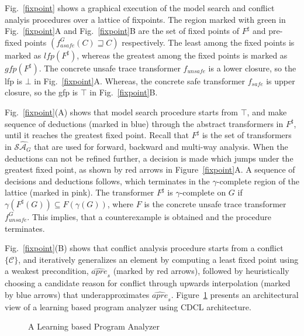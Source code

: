 Fig.~\ref{fixpoint} shows a graphical execution of the model search and 
conflict analyis procedures over a lattice of fixpoints.  The region marked 
with green in Fig.~\ref{fixpoint}A and Fig.~\ref{fixpoint}B are the set of 
fixed points of $F^\sharp$ and pre-fixed points $(f_{asafe}^G(C) \sqsupseteq C)$ 
respectively.   The least among the fixed points is marked as
$lfp(F^\sharp)$, whereas the greatest among the fixed points is marked as
$gfp(F^\sharp)$. The concrete unsafe trace transformer $f_{unsafe}$ is a 
lower closure, so the lfp is $\bot$ in Fig.~\ref{fixpoint}A.  Whereas, the 
concrete safe transformer $f_{safe}$ is upper closure, so the gfp is 
$\top$ in Fig.~\ref{fixpoint}B.

%

Fig.~\ref{fixpoint}(A) shows that model search procedure starts 
from $\top$, and make sequence of deductions (marked in blue) 
through the abstract transformers in $F^\sharp$, until it reaches 
the greatest fixed point.  Recall that $F^\sharp$ is the
set of transformers in $\widehat{\mathcal{SA}_G}$ that are used for forward, 
backward and multi-way analysis. 
When the deductions can not be refined further, a decision is made which 
jumps under the greatest fixed point, as shown by red arrows in 
Figure~\ref{fixpoint}A.   
A sequence of decisions and deductions follows, which
terminates in the $\gamma$-complete region of the lattice (marked in pink). The
transformer $F^\sharp$ is $\gamma$-complete on $G$ if $\gamma(F^\sharp(G))
\subseteq F(\gamma(G))$, where $F$ is the concrete unsafe trace transformer
$f_{unsafe}^{G}$.  This implies, that a counterexample is obtained and the
procedure terminates.
%


Fig.~\ref{fixpoint}(B) shows that conflict analysis procedure starts from a
conflict $\{\mathcal{C}\}$, and iteratively generalizes an element by computing a
least fixed point using a weakest precondition, $\widehat{apre}_s$ (marked by
red arrows), followed by heuristically choosing a candidate reason for conflict 
through upwards interpolation (marked by blue arrows) that underapproximates 
$\widehat{apre}_s$.   Figure~\ref{fig:acdcl} presents an architectural view 
of a learning based program analyzer using CDCL architecture.  
%
\begin{figure}[htbp]
\centering
\vspace*{-0.2cm}
\caption{A Learning based Program Analyzer \label{fig:acdcl}}
\end{figure}
%
%

